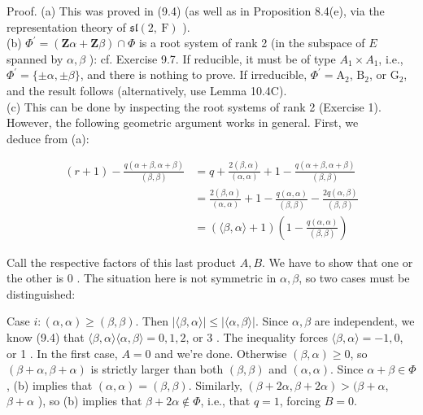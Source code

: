\documentclass[10pt]{article}
\begin{document}
Proof. (a) This was proved in (9.4) (as well as in Proposition 8.4(e), via the representation theory of $\mathfrak{s l}(2, \mathrm{~F})$ ).\\
(b) $\Phi^{\prime}=(\mathbf{Z} \alpha+\mathbf{Z} \beta) \cap \Phi$ is a root system of rank 2 (in the subspace of $E$ spanned by $\alpha, \beta$ ): cf. Exercise 9.7. If reducible, it must be of type $A_{1} \times A_{1}$, i.e., $\Phi^{\prime}=\{ \pm \alpha, \pm \beta\}$, and there is nothing to prove. If irreducible, $\Phi^{\prime}=\mathrm{A}_{2}$, $\mathrm{B}_{2}$, or $\mathrm{G}_{2}$, and the result follows (alternatively, use Lemma 10.4C).\\
(c) This can be done by inspecting the root systems of rank 2 (Exercise 1). However, the following geometric argument works in general. First, we\\
deduce from (a):

$$
\begin{aligned}
(r+1)-\frac{q(\alpha+\beta, \alpha+\beta)}{(\beta, \beta)} & =q+\frac{2(\beta, \alpha)}{(\alpha, \alpha)}+1-\frac{q(\alpha+\beta, \alpha+\beta)}{(\beta, \beta)} \\
& =\frac{2(\beta, \alpha)}{(\alpha, \alpha)}+1-\frac{q(\alpha, \alpha)}{(\beta, \beta)}-\frac{2 q(\alpha, \beta)}{(\beta, \beta)} \\
& =(\langle\beta, \alpha\rangle+1)\left(1-\frac{q(\alpha, \alpha)}{(\beta, \beta)}\right)
\end{aligned}
$$

Call the respective factors of this last product $A, B$. We have to show that one or the other is 0 . The situation here is not symmetric in $\alpha, \beta$, so two cases must be distinguished:

Case $i:(\alpha, \alpha) \geq(\beta, \beta)$. Then $|\langle\beta, \alpha\rangle| \leq|\langle\alpha, \beta\rangle|$. Since $\alpha, \beta$ are independent, we know (9.4) that $\langle\beta, \alpha\rangle\langle\alpha, \beta\rangle=0,1,2$, or 3 . The inequality forces $\langle\beta, \alpha\rangle=-1,0$, or 1 . In the first case, $A=0$ and we're done. Otherwise $(\beta, \alpha) \geq 0$, so $(\beta+\alpha, \beta+\alpha)$ is strictly larger than both $(\beta, \beta)$ and $(\alpha, \alpha)$. Since $\alpha+\beta \in \Phi$, (b) implies that $(\alpha, \alpha)=(\beta, \beta)$. Similarly, $(\beta+2 \alpha, \beta+2 \alpha)>(\beta+\alpha$, $\beta+\alpha$ ), so (b) implies that $\beta+2 \alpha \notin \Phi$, i.e., that $q=1$, forcing $B=0$.
\end{document}
